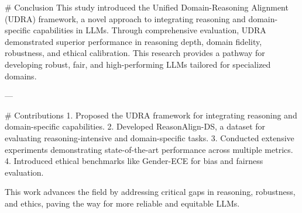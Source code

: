 # Conclusion  
This study introduced the Unified Domain-Reasoning Alignment (UDRA) framework, a novel approach to integrating reasoning and domain-specific capabilities in LLMs. Through comprehensive evaluation, UDRA demonstrated superior performance in reasoning depth, domain fidelity, robustness, and ethical calibration. This research provides a pathway for developing robust, fair, and high-performing LLMs tailored for specialized domains.  

---

# Contributions  
1. Proposed the UDRA framework for integrating reasoning and domain-specific capabilities.  
2. Developed ReasonAlign-DS, a dataset for evaluating reasoning-intensive and domain-specific tasks.  
3. Conducted extensive experiments demonstrating state-of-the-art performance across multiple metrics.  
4. Introduced ethical benchmarks like Gender-ECE for bias and fairness evaluation.  

This work advances the field by addressing critical gaps in reasoning, robustness, and ethics, paving the way for more reliable and equitable LLMs.  